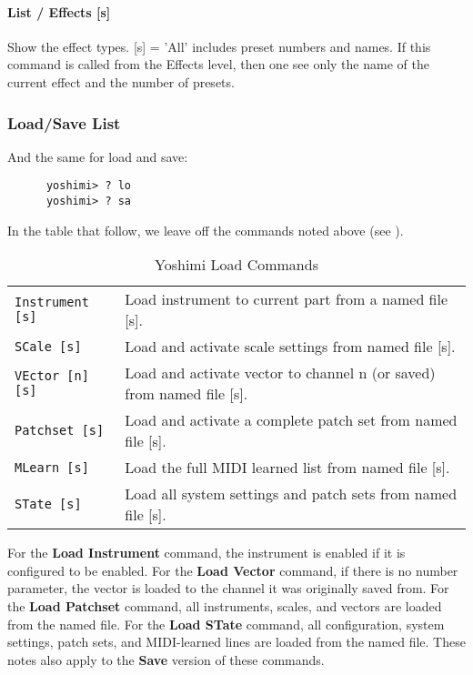 \paragraph{List / Effects [s]}
\label{paragraph:command_line_list_effects}

   Show the effect types.
   [s] = 'All' includes preset numbers and names.
   If this command is called from the Effects level, then one see only the name
   of the current effect and the number of presets.

\subsubsection{Load/Save List}
\label{subsec:command_line_loadsave_list}

   And the same for load and save:

   \begin{verbatim}
      yoshimi> ? lo
      yoshimi> ? sa
   \end{verbatim}

   In the table that follow, we leave off the commands noted above
   (see ).

   \begin{table}[H]
      \centering
      \caption{Yoshimi Load Commands}
      \label{table:yoshimi_text_load_commands}
      \begin{tabular}{l l}

\texttt{Instrument [s]} &
   Load instrument to current part from a named file [s]. \\
\texttt{SCale [s]} &
   Load and activate scale settings from named file [s]. \\
\texttt{VEctor [n] [s]} &
   Load and activate vector to channel n (or saved) from named file [s]. \\
\texttt{Patchset [s]} &
   Load and activate a complete patch set from named file [s]. \\
\texttt{MLearn [s]} &
   Load the full MIDI learned list from named file [s]. \\
\texttt{STate [s]} &
   Load all system settings and patch sets from named file [s]. \\

      \end{tabular}
   \end{table}

   For the \textbf{Load Instrument} command, the instrument is enabled if it is
   configured to be enabled.  For the \textbf{Load Vector} command, if there is
   no number parameter, the vector is loaded to the channel it was originally
   saved from.
   For the \textbf{Load Patchset} command, all instruments, scales, and vectors
   are loaded from the named file.
   For the \textbf{Load STate} command, all configuration, system settings,
   patch sets, and MIDI-learned lines are loaded from the named file.
   These notes also apply to the \textbf{Save} version of these commands.

